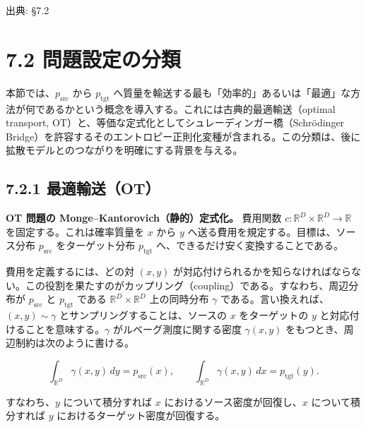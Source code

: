 

{\color{gray}\footnotesize 出典: §7.2\par}
\vspace{0.2em}

\section*{7.2 問題設定の分類}


本節では、$p_{\mathrm{src}}$ から $p_{\mathrm{tgt}}$ へ質量を輸送する最も「効率的」あるいは「最適」な方法が何であるかという概念を導入する。これには古典的最適輸送（optimal transport, OT）と、等価な定式化としてシュレーディンガー橋（Schrödinger Bridge）を許容するそのエントロピー正則化変種が含まれる。この分類は、後に拡散モデルとのつながりを明確にする背景を与える。

\subsection*{7.2.1 最適輸送（OT）}




\textbf{OT 問題の Monge–Kantorovich（静的）定式化。} 費用関数 $c:\mathbb{R}^D\times\mathbb{R}^D\to\mathbb{R}$ を固定する。これは確率質量を $x$ から $y$ へ送る費用を規定する。目標は、ソース分布 $p_{\mathrm{src}}$ をターゲット分布 $p_{\mathrm{tgt}}$ へ、できるだけ安く変換することである。

費用を定義するには、どの対 $(x,y)$ が対応付けられるかを知らなければならない。この役割を果たすのがカップリング（coupling）である。すなわち、周辺分布が $p_{\mathrm{src}}$ と $p_{\mathrm{tgt}}$ である $\mathbb{R}^D\times\mathbb{R}^D$ 上の同時分布 $\gamma$ である。言い換えれば、$(x,y)\sim\gamma$ とサンプリングすることは、ソースの $x$ をターゲットの $y$ と対応付けることを意味する。$\gamma$ がルベーグ測度に関する密度 $\gamma(x,y)$ をもつとき、周辺制約は次のように書ける。

\[
\int_{\mathbb{R}^D}\gamma(x,y)\,dy = p_{\mathrm{src}}(x),\qquad
\int_{\mathbb{R}^D}\gamma(x,y)\,dx = p_{\mathrm{tgt}}(y).
\]


すなわち、$y$ について積分すれば $x$ におけるソース密度が回復し、$x$ について積分すれば $y$ におけるターゲット密度が回復する。

